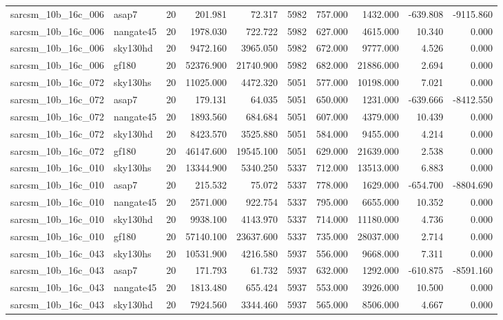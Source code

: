 \documentclass{article}
\begin{document}
\begin{longtable}{llrrrrrrrr}
sarcsm\_10b\_16c\_006 & asap7 & 20 & 201.981 & 72.317 & 5982 & 757.000 & 1432.000 & -639.808 & -9115.860 \\
sarcsm\_10b\_16c\_006 & nangate45 & 20 & 1978.030 & 722.722 & 5982 & 627.000 & 4615.000 & 10.340 & 0.000 \\
sarcsm\_10b\_16c\_006 & sky130hd & 20 & 9472.160 & 3965.050 & 5982 & 672.000 & 9777.000 & 4.526 & 0.000 \\
sarcsm\_10b\_16c\_006 & gf180 & 20 & 52376.900 & 21740.900 & 5982 & 682.000 & 21886.000 & 2.694 & 0.000 \\
sarcsm\_10b\_16c\_072 & sky130hs & 20 & 11025.000 & 4472.320 & 5051 & 577.000 & 10198.000 & 7.021 & 0.000 \\
sarcsm\_10b\_16c\_072 & asap7 & 20 & 179.131 & 64.035 & 5051 & 650.000 & 1231.000 & -639.666 & -8412.550 \\
sarcsm\_10b\_16c\_072 & nangate45 & 20 & 1893.560 & 684.684 & 5051 & 607.000 & 4379.000 & 10.439 & 0.000 \\
sarcsm\_10b\_16c\_072 & sky130hd & 20 & 8423.570 & 3525.880 & 5051 & 584.000 & 9455.000 & 4.214 & 0.000 \\
sarcsm\_10b\_16c\_072 & gf180 & 20 & 46147.600 & 19545.100 & 5051 & 629.000 & 21639.000 & 2.538 & 0.000 \\
sarcsm\_10b\_16c\_010 & sky130hs & 20 & 13344.900 & 5340.250 & 5337 & 712.000 & 13513.000 & 6.883 & 0.000 \\
sarcsm\_10b\_16c\_010 & asap7 & 20 & 215.532 & 75.072 & 5337 & 778.000 & 1629.000 & -654.700 & -8804.690 \\
sarcsm\_10b\_16c\_010 & nangate45 & 20 & 2571.000 & 922.754 & 5337 & 795.000 & 6655.000 & 10.352 & 0.000 \\
sarcsm\_10b\_16c\_010 & sky130hd & 20 & 9938.100 & 4143.970 & 5337 & 714.000 & 11180.000 & 4.736 & 0.000 \\
sarcsm\_10b\_16c\_010 & gf180 & 20 & 57140.100 & 23637.600 & 5337 & 735.000 & 28037.000 & 2.714 & 0.000 \\
sarcsm\_10b\_16c\_043 & sky130hs & 20 & 10531.900 & 4216.580 & 5937 & 556.000 & 9668.000 & 7.311 & 0.000 \\
sarcsm\_10b\_16c\_043 & asap7 & 20 & 171.793 & 61.732 & 5937 & 632.000 & 1292.000 & -610.875 & -8591.160 \\
sarcsm\_10b\_16c\_043 & nangate45 & 20 & 1813.480 & 655.424 & 5937 & 553.000 & 3926.000 & 10.500 & 0.000 \\
sarcsm\_10b\_16c\_043 & sky130hd & 20 & 7924.560 & 3344.460 & 5937 & 565.000 & 8506.000 & 4.667 & 0.000 \\

\end{longtable}
\end{document}
